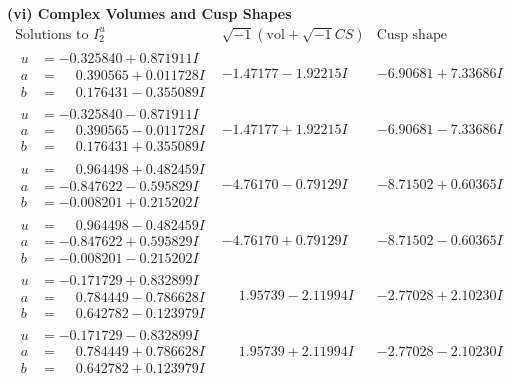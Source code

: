 \documentclass[1p]{elsarticle_modified}
\theoremstyle{definition}
\newcommand{\I}{\sqrt{-1}}
\begin{document}
\newpage\flushleft \textbf{(vi) Complex Volumes and Cusp Shapes}
$$\begin{array}{c|c|c}  
\text{Solutions to }I^u_{2}& \I (\text{vol} + \sqrt{-1}CS) & \text{Cusp shape}\\
 \hline 
\begin{aligned}
u &= -0.325840 + 0.871911 I \\
a &= \phantom{-}0.390565 + 0.011728 I \\
b &= \phantom{-}0.176431 - 0.355089 I\end{aligned}
 & -1.47177 - 1.92215 I & -6.90681 + 7.33686 I \\ \hline\begin{aligned}
u &= -0.325840 - 0.871911 I \\
a &= \phantom{-}0.390565 - 0.011728 I \\
b &= \phantom{-}0.176431 + 0.355089 I\end{aligned}
 & -1.47177 + 1.92215 I & -6.90681 - 7.33686 I \\ \hline\begin{aligned}
u &= \phantom{-}0.964498 + 0.482459 I \\
a &= -0.847622 - 0.595829 I \\
b &= -0.008201 + 0.215202 I\end{aligned}
 & -4.76170 - 0.79129 I & -8.71502 + 0.60365 I \\ \hline\begin{aligned}
u &= \phantom{-}0.964498 - 0.482459 I \\
a &= -0.847622 + 0.595829 I \\
b &= -0.008201 - 0.215202 I\end{aligned}
 & -4.76170 + 0.79129 I & -8.71502 - 0.60365 I \\ \hline\begin{aligned}
u &= -0.171729 + 0.832899 I \\
a &= \phantom{-}0.784449 - 0.786628 I \\
b &= \phantom{-}0.642782 - 0.123979 I\end{aligned}
 & \phantom{-}1.95739 - 2.11994 I & -2.77028 + 2.10230 I \\ \hline\begin{aligned}
u &= -0.171729 - 0.832899 I \\
a &= \phantom{-}0.784449 + 0.786628 I \\
b &= \phantom{-}0.642782 + 0.123979 I\end{aligned}
 & \phantom{-}1.95739 + 2.11994 I & -2.77028 - 2.10230 I \\ \hline\begin{aligned}

\end{aligned}
\end{array}$$
\end{document}
